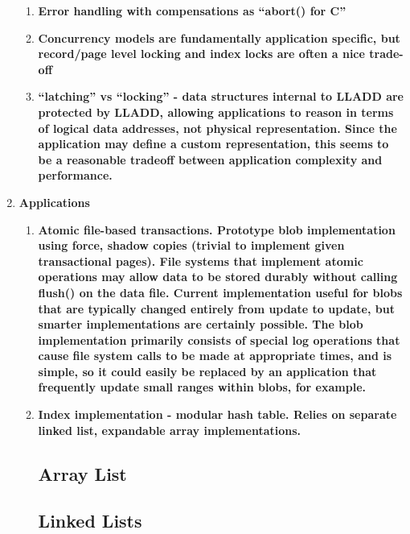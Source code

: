 \documentclass[letterpaper,english]{article}
\begin{document}
\begin{enumerate}
\begin{enumerate}
  \item {\bf Error handling with compensations as {}``abort() for C''}


  \item {\bf Concurrency models are fundamentally application specific, but
  record/page level locking and index locks are often a nice trade-off}

  \item {\bf {}``latching'' vs {}``locking'' - data structures internal to
  LLADD are protected by LLADD, allowing applications to reason in
  terms of logical data addresses, not physical representation. Since
  the application may define a custom representation, this seems to be
  a reasonable tradeoff between application complexity and
  performance.}

\end{enumerate}

\item {\bf Applications }

\begin{enumerate}

  \item {\bf Atomic file-based transactions. Prototype blob implementation
  using force, shadow copies (trivial to implement given transactional
  pages).  File systems that implement atomic operations may allow
  data to be stored durably without calling flush() on the data
  file. Current implementation useful for blobs that are typically
  changed entirely from update to update, but smarter implementations
  are certainly possible. The blob implementation primarily consists
  of special log operations that cause file system calls to be made at
  appropriate times, and is simple, so it could easily be replaced by
  an application that frequently update small ranges within blobs, for
  example.}

  \item {\bf Index implementation - modular hash table. Relies on separate
  linked list, expandable array implementations.}

\subsection{Array List}
\subsection{Linked Lists}


\end{enumerate}
\end{enumerate}
\end{document}
